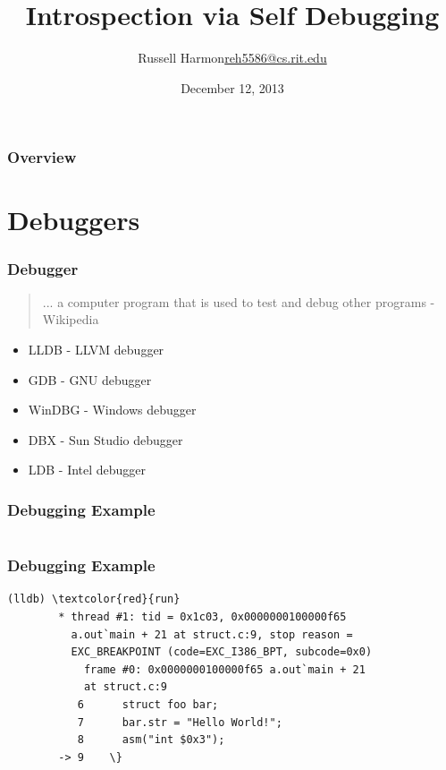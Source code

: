 \documentclass{beamer}
\title{Introspection via Self Debugging}
\author{\texorpdfstring{Russell Harmon\newline\url{reh5586@cs.rit.edu}}{Russell Harmon}}
\institute {
	Rochester Institute of Technology\newline
	Computer Science\newline
}
\date{December 12, 2013}
\begin{document}
\maketitle

\begin{frame}
	\frametitle{Overview}
	\tableofcontents
\end{frame}

\section{Debuggers}

\begin{frame}
	\frametitle{Debugger}

	\begin{quote}
		... a computer program that is used to test and debug other programs -Wikipedia
	\end{quote}

	\pause

	\begin{itemize}
		\item LLDB - LLVM debugger
		\item GDB - GNU debugger
		\item WinDBG - Windows debugger
		\item DBX - Sun Studio debugger
		\item LDB - Intel debugger
	\end{itemize}
\end{frame}

\begin{frame}
	\frametitle{Debugging Example}

	\inputminted[tabsize=4,linenos]{c}{struct.c}
\end{frame}

\begin{frame}[fragile]
	\frametitle{Debugging Example}

	\begin{Verbatim}[commandchars=\\\{\}]
		(lldb) \textcolor{red}{run}
		* thread #1: tid = 0x1c03, 0x0000000100000f65
		  a.out`main + 21 at struct.c:9, stop reason =
		  EXC_BREAKPOINT (code=EXC_I386_BPT, subcode=0x0)
		    frame #0: 0x0000000100000f65 a.out`main + 21
		    at struct.c:9
		   6      struct foo bar;
		   7      bar.str = "Hello World!";
		   8      asm("int $0x3");
		-> 9    \}
	\end{Verbatim}
\end{frame}
\end{document}

